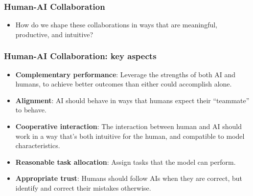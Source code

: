 \documentclass{beamer}
\begin{document}
\begin{frame}
    \frametitle{Human-AI Collaboration}
    \footnotesize
    
    \begin{itemize}
        \item How do we shape these collaborations in ways that are meaningful, productive, and intuitive?
    \end{itemize}
\end{frame}

    

\begin{frame}
    \frametitle{Human-AI Collaboration: key aspects}
    \footnotesize


    \vspace{0.5cm}

    
    \begin{itemize}
        \item \textbf{Complementary performance}: Leverage the strengths of both AI and humans, to achieve better outcomes than either could accomplish alone.
        
        \item \textbf{Alignment}: AI should behave in ways that humans expect their ``teammate'' to behave.
        
        \item \textbf{Cooperative interaction}: The interaction between human and AI should work in a way that's both intuitive for the human, and compatible to model characteristics.
        
        \item \textbf{Reasonable task allocation}: Assign tasks that the model can perform.
        
        \item \textbf{Appropriate trust}: Humans should follow AIs when they are correct, but identify and correct their mistakes otherwise.
    \end{itemize}
\end{frame}
\end{document}
